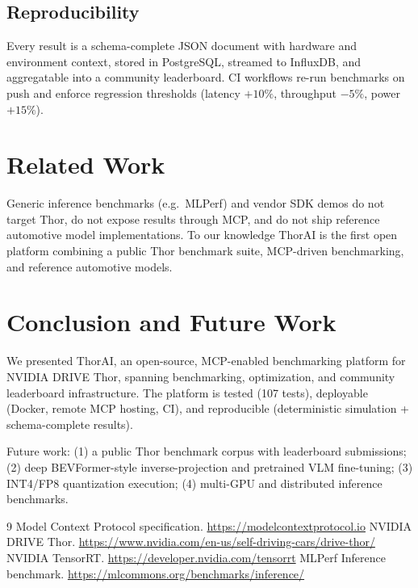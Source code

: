 \documentclass[11pt]{article}
\begin{document}
\subsection{Reproducibility}
Every result is a schema-complete JSON document with hardware and
environment context, stored in PostgreSQL, streamed to InfluxDB, and
aggregatable into a community leaderboard. CI workflows re-run
benchmarks on push and enforce regression thresholds (latency $+10\%$,
throughput $-5\%$, power $+15\%$).

\section{Related Work}
\label{sec:related}
Generic inference benchmarks (e.g.\ MLPerf) and vendor SDK demos do
not target Thor, do not expose results through MCP, and do not ship
reference automotive model implementations. To our knowledge ThorAI
is the first open platform combining a public Thor benchmark suite,
MCP-driven benchmarking, and reference automotive models.

\section{Conclusion and Future Work}
\label{sec:conclusion}
We presented ThorAI, an open-source, MCP-enabled benchmarking platform
for NVIDIA DRIVE Thor, spanning benchmarking, optimization, and
community leaderboard infrastructure. The platform is tested (107
tests), deployable (Docker, remote MCP hosting, CI), and reproducible
(deterministic simulation + schema-complete results).

Future work: (1) a public Thor benchmark corpus with leaderboard
submissions; (2) deep BEVFormer-style inverse-projection and
pretrained VLM fine-tuning; (3) INT4/FP8 quantization execution; (4)
multi-GPU and distributed inference benchmarks.

\begin{thebibliography}{9}
Model Context Protocol specification. \url{https://modelcontextprotocol.io}
NVIDIA DRIVE Thor. \url{https://www.nvidia.com/en-us/self-driving-cars/drive-thor/}
NVIDIA TensorRT. \url{https://developer.nvidia.com/tensorrt}
MLPerf Inference benchmark. \url{https://mlcommons.org/benchmarks/inference/}
\end{thebibliography}
\end{document}
